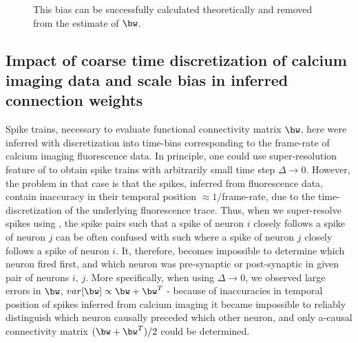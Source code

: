 \begin{figure}[h]
{This bias can be successfully calculated theoretically and removed from
the estimate of $\bw$.} \label{fig:scatters} \end{figure}

\subsection{Impact of coarse time discretization of calcium imaging data and scale bias in inferred connection weights}
Spike trains, necessary to evaluate functional connectivity matrix $\bw$, here were inferred with discretization into time-bins corresponding to the frame-rate of calcium imaging fluorescence data. In principle, one could use super-resolution feature of \cite{Vogelstein2009} to obtain spike trains with arbitrarily small time step $\Delta\rightarrow 0$. However, the problem in that case is that the spikes, inferred from fluorescence data, contain inaccuracy in their temporal position $\approx 1/$frame-rate,  due to the time-discretization of the underlying fluorescence trace.
Thus, when we super-resolve spikes using \cite{Vogelstein2009}, the spike pairs such that a spike of neuron $i$ closely follows a spike of neuron $j$ can be often confused with such where a spike of neuron $j$ closely follows a spike of neuron $i$.
It, therefore, becomes impossible to determine which neuron fired first, and which neuron
was pre-synaptic or post-synaptic in given pair of neurons $i$, $j$.
More specifically,
when using $\Delta \rightarrow 0$, we observed large errors in $\bw$,
$var[\bw] \propto \bw + \bw^T$ - because of inaccuracies in temporal position of spikes inferred from calcium imaging it became impossible to reliably distinguish which neuron causally preceded which other neuron, and only a-causal connectivity matrix $(\bw + \bw^T)/2$ could be determined.

